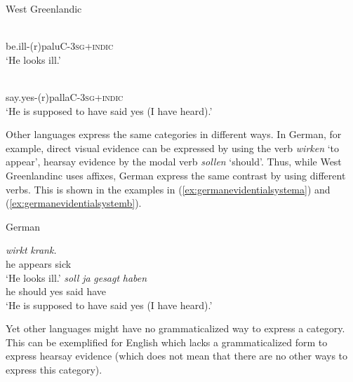 \begin{exe}
\ex West Greenlandic \citep[294--295]{fortescue2003evidentiality} \begin{xlist}
\ex {} \\
{be.ill-(r)paluC-\textsc{3sg}+\textsc{indic}} \\
\trans `He looks ill.' \label{ex:westgreenlandicevidential}

\ex {} \\
{say.yes-(r)pallaC-\textsc{3sg}+\textsc{indic}} \\
\trans `He is supposed to have said yes (I have heard).' \label{ex:westgreenlandicevidentialb}

\end{xlist}
\end{exe} 

\noindent Other languages express the same categories in different ways. In German, for example, direct visual evidence can be expressed by using the verb \textit{wirken} `to appear', hearsay evidence by the modal verb \textit{sollen} `should'. Thus, while West Greenlandinc uses affixes, German express the same contrast by using different verbs.  This is shown in the examples in (\ref{ex:germanevidentialsystema}) and (\ref{ex:germanevidentialsystemb}). 

\begin{exe}
\ex German\begin{xlist}
\ex {} {\textit{wirkt}} {\textit{krank.}} \\
{he} {appears} {sick} \\
\trans `He looks ill.' \label{ex:germanevidentialsystema}
\ex {} {\textit{soll}} {\textit{ja}} {\textit{gesagt}} {\textit{haben}} \\
{he} {should} {yes} {said} {have} \\
\trans `He is supposed to have said yes (I have heard).' \label{ex:germanevidentialsystemb}
\end{xlist}
\end{exe} 

\noindent Yet other languages might have no grammaticalized way to express a category. This can be exemplified for English which lacks a grammaticalized form to express hearsay evidence (which does not mean that there are no other ways to express this category). 

